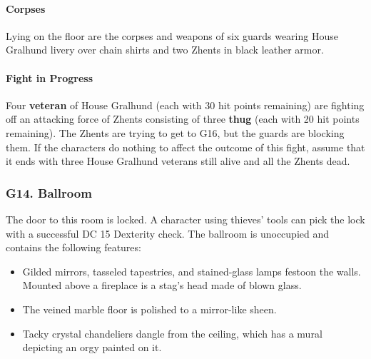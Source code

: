 \documentclass[10pt,a4paper,twoside,twocolumn,openany,nodeprecatedcode]{dndbook}
\begin{document}
\paragraph{Corpses}
Lying on the floor are the corpses and weapons of six guards wearing House Gralhund livery over chain shirts and two Zhents in black leather armor.
\paragraph{Fight in Progress}
Four \textbf{veteran} of House Gralhund (each with 30 hit points remaining) are fighting off an attacking force of Zhents consisting of three \textbf{thug} (each with 20 hit points remaining). The Zhents are trying to get to G16, but the guards are blocking them.
If the characters do nothing to affect the outcome of this fight, assume that it ends with three House Gralhund veterans still alive and all the Zhents dead.
\subsubsection{G14. Ballroom}
The door to this room is locked. A character using thieves' tools can pick the lock with a successful DC 15 Dexterity check. The ballroom is unoccupied and contains the following features:
\begin{itemize}

\item Gilded mirrors, tasseled tapestries, and stained-glass lamps festoon the walls. Mounted above a fireplace is a stag's head made of blown glass.
\item The veined marble floor is polished to a mirror-like sheen.
\item Tacky crystal chandeliers dangle from the ceiling, which has a mural depicting an orgy painted on it.
\end{itemize}
\end{document}
